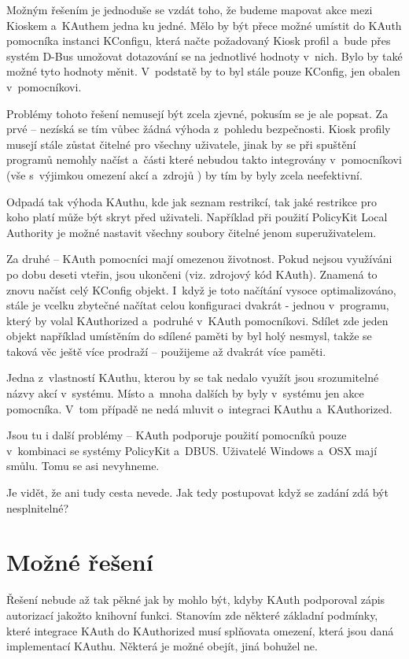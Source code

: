 {Možným řešením je jednoduše se vzdát toho, že budeme mapovat akce mezi Kioskem a~KAuthem jedna ku jedné. Mělo by být přece možné umístit do KAuth pomocníka instanci KConfigu, která načte požadovaný Kiosk profil a~bude přes systém D-Bus umožovat dotazování se na jednotlivé hodnoty v~nich. Bylo by také možné tyto hodnoty měnit. V~podstatě by to byl stále pouze KConfig, jen obalen v~pomocníkovi.

Problémy tohoto řešení nemusejí být zcela zjevné, pokusím se je ale popsat. Za prvé -- nezíská se tím vůbec žádná výhoda z~pohledu bezpečnosti. Kiosk profily musejí stále zůstat čitelné pro všechny uživatele, jinak by se při spuštění programů nemohly načíst a~části které nebudou takto integrovány v~pomocníkovi (vše s~výjimkou omezení akcí a~zdrojů ) by tím by byly zcela neefektivní.

Odpadá tak výhoda KAuthu, kde jak seznam restrikcí, tak jaké restrikce pro koho platí může být skryt před uživateli. Například při použití PolicyKit Local Authority je možné nastavit všechny soubory čitelné jenom superuživatelem.

Za druhé -- KAuth pomocníci mají omezenou životnost. Pokud nejsou využíváni po dobu deseti vteřin, jsou ukončeni (viz. zdrojový kód KAuth). Znamená to znovu načíst celý KConfig objekt. I~když je toto načítání vysoce optimalizováno, stále je vcelku zbytečné načítat celou konfiguraci dvakrát - jednou v~programu, který by volal KAuthorized a~podruhé v~KAuth pomocníkovi. Sdílet zde jeden objekt například umístěním do sdílené paměti by byl holý nesmysl, takže se taková věc ještě více prodraží -- použijeme až dvakrát více paměti.

Jedna z~vlastností KAuthu, kterou by se tak nedalo využít jsou srozumitelné názvy akcí v~systému. Místo  a~mnoha dalších by byly v~systému jen akce pomocníka. V~tom případě ne nedá mluvit o~integraci KAuthu a~KAuthorized.

Jsou tu i další problémy -- KAuth podporuje použití pomocníků pouze v~kombinaci se systémy PolicyKit a~DBUS. Uživatelé Windows a~OSX mají smůlu. Tomu se asi nevyhneme.

Je vidět, že ani tudy cesta nevede. Jak tedy postupovat když se zadání zdá být nesplnitelné?

\section{Možné řešení}\label{mozres}
Řešení nebude až tak pěkné jak by mohlo být, kdyby KAuth podporoval zápis autorizací jakožto knihovní funkci. Stanovím zde některé základní podmínky, které integrace KAuth do KAuthorized musí splňovata omezení, která jsou daná implementací KAuthu. Některá je možné obejít, jiná bohužel ne.

}

